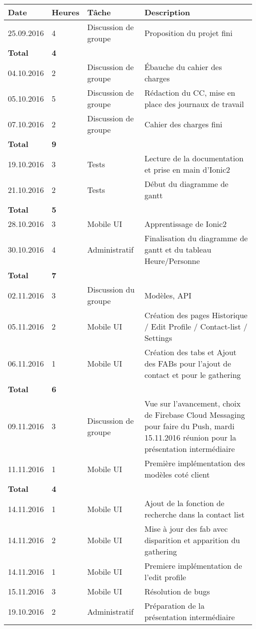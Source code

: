 \documentclass[french]{article}
\begin{document}
	\begin{longtable}{p{}|p{}|p{}|p{}}
		Date&Heures&Tâche&Description\\
		\hline \hline
		25.09.2016 & 4 & Discussion de groupe & Proposition du projet fini\\
		\textbf{Total} & \textbf{4} &&\\
		\hline
		04.10.2016 & 2 & Discussion de groupe & Ébauche du cahier des charges\\
		05.10.2016 & 5 & Discussion de groupe & Rédaction du CC, mise en place des journaux de travail\\
		07.10.2016 & 2 & Discussion de groupe & Cahier des charges fini\\
		\textbf{Total} & \textbf{9} &&\\
		\hline
		19.10.2016 & 3 & Tests & Lecture de la documentation et prise en main d'Ionic2\\
		21.10.2016 & 2 & Tests & Début du diagramme de gantt\\
		\textbf{Total} & \textbf{5} &&\\
		\hline
		28.10.2016 & 3 & Mobile UI & Apprentissage de Ionic2 \\
		30.10.2016 & 4 & Administratif & Finalisation du diagramme de gantt et du tableau Heure/Personne  \\
		\textbf{Total} & \textbf{7} &&\\
		\hline
		02.11.2016 & 3 & Discussion du groupe & Modèles, API\\
		05.11.2016 & 2 & Mobile UI & Création des pages Historique / Edit Profile / Contact-list / Settings\\
		06.11.2016 & 1 & Mobile UI & Création des tabs et Ajout des FABs pour l'ajout de contact et pour le gathering\\
		\textbf{Total} & \textbf{6} &&\\
		\hline
		09.11.2016 & 3 & Discussion de groupe & Vue sur l'avancement, choix de Firebase Cloud Messaging pour faire du Push, mardi 15.11.2016 réunion pour la présentation intermédiaire\\
		11.11.2016 & 1 & Mobile UI & Première implémentation des modèles coté client\\
		\textbf{Total} & \textbf{4} &&\\
		\hline
		14.11.2016 & 1 & Mobile UI & Ajout de la fonction de recherche dans la contact list\\
		14.11.2016 & 2 & Mobile UI & Mise à jour des fab avec disparition et apparition du gathering\\
		14.11.2016 & 1 & Mobile UI & Premiere implémentation de l'edit profile\\
		15.11.2016 & 3 & Mobile UI & Résolution de bugs\\
		19.10.2016 & 2 & Administratif & Préparation de la présentation intermédiaire  \\


\end{longtable}
\end{document}
